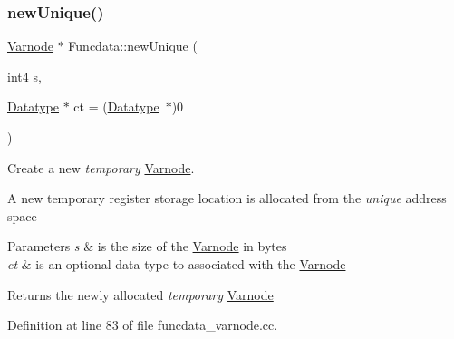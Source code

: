 \subsubsection{\texorpdfstring{newUnique()}{newUnique()}}
{\footnotesize\ttfamily \mbox{\hyperlink{class_varnode}{Varnode}} $\ast$ Funcdata\+::new\+Unique (\begin{DoxyParamCaption}\item[{int4}]{s,  }\item[{\mbox{\hyperlink{class_datatype}{Datatype}} $\ast$}]{ct = {\ttfamily (\mbox{\hyperlink{class_datatype}{Datatype}}~$\ast$)0} }\end{DoxyParamCaption})}



Create a new {\itshape temporary} \mbox{\hyperlink{class_varnode}{Varnode}}. 

A new temporary register storage location is allocated from the {\itshape unique} address space 
\begin{DoxyParams}{Parameters}
{\em s} & is the size of the \mbox{\hyperlink{class_varnode}{Varnode}} in bytes \\
\hline
{\em ct} & is an optional data-\/type to associated with the \mbox{\hyperlink{class_varnode}{Varnode}} \\
\hline
\end{DoxyParams}
\begin{DoxyReturn}{Returns}
the newly allocated {\itshape temporary} \mbox{\hyperlink{class_varnode}{Varnode}} 
\end{DoxyReturn}


Definition at line 83 of file funcdata\+\_\+varnode.\+cc.


